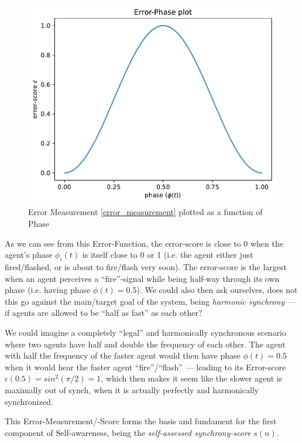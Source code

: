 			\begin{figure}[h!]
				\centering
				\includegraphics[width=0.8\linewidth]{Assets/Figures/PhaseErrorFunction.pdf}
				\caption{Error Measurement \eqref{error_measurement} plotted as a function of Phase}
				\label{fig:error_measurement}
			\end{figure}
			
			As we can see from this Error-Function, the error-score is close to 0 when the agent's phase $\phi_i(t)$ is itself close to 0 or 1 (i.e. the agent either just fired/flashed, or is about to fire/flash very soon). The error-score is the largest when an agent perceives a ``fire''-signal while being half-way through its own phase (i.e. having phase $\phi(t)=0.5$). We could also then ask ourselves, does not this go against the main/target goal of the system, being \textit{harmonic synchrony} — if agents are allowed to be ``half as fast'' as each other? 
			
			We could imagine a completely ``legal'' and harmonically synchronous scenario where two agents have half and double the frequency of each other. The agent with half the frequency of the faster agent would then have phase $\phi(t)=0.5$ when it would hear the faster agent ``fire''/``flash'' — leading to its Error-score $\epsilon(0.5) = sin^2(\pi/2) = 1$, which then makes it seem like the slower agent is maximally out of synch, when it is actually perfectly and harmonically synchronized.  
			
			This Error-Measurement/-Score forms the basis and fundament for the first component of Self-awareness, being the \textit{self-assessed synchrony-score} $s(n)$.
			
